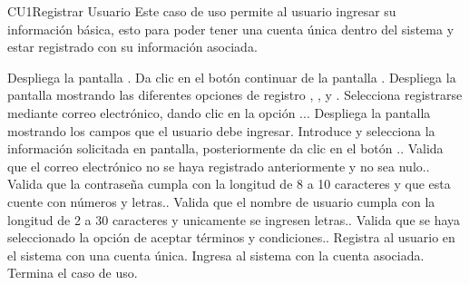 
% 



	\begin{UseCase}{CU1}{Registrar Usuario}{
		Este caso de uso permite al usuario ingresar su información básica, esto para poder tener una cuenta única dentro del sistema y estar registrado con su información asociada. 
	}
	\end{UseCase}
	\begin{UCtrayectoria}
		\UCpaso Despliega la pantalla  .
		\UCpaso[\UCactor] Da clic en el botón continuar de la pantalla .
		\UCpaso Despliega la pantalla  mostrando las diferentes opciones de registro , ,  y .
		\UCpaso[\UCactor] Selecciona registrarse mediante correo electrónico, dando clic en la opción ...
		\UCpaso Despliega la pantalla  mostrando los campos que el usuario debe ingresar.
		\UCpaso[\UCactor] Introduce y selecciona la información solicitada en pantalla, posteriormente da clic en el botón .\label{CU1-Registrar}.
		\UCpaso Valida que el correo electrónico no se haya registrado anteriormente y no sea nulo..
		\UCpaso Valida que la contraseña cumpla con la longitud de 8 a 10 caracteres y que esta cuente con números y letras..	
		\UCpaso Valida que el nombre de usuario cumpla con la longitud de 2 a 30 caracteres y unicamente se ingresen letras..
		\UCpaso Valida que se haya seleccionado la opción de aceptar términos y condiciones..
		\UCpaso Registra al usuario en el sistema con una cuenta única.
		\UCpaso Ingresa al sistema con la cuenta asociada.
		\UCpaso Termina el caso de uso.
		
	\end{UCtrayectoria}

